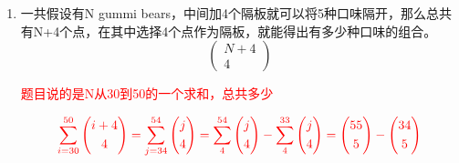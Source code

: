 \documentclass{article}
\begin{document}
\begin{enumerate}[label=(\alph*)]
\item 一共假设有N gummi bears，中间加4个隔板就可以将5种口味隔开，那么总共有N+4个点，在其中选择4个点作为隔板，就能得出有多少种口味的组合。
$$
\left( \begin{gathered}N+4\\ 4\end{gathered} \right)  
$$

\textcolor{red}{题目说的是N从30到50的一个求和，总共多少}


$$
\textcolor{red} {
\sum^{50}_{i=30} \left( \begin{gathered}i+4\\ 4\end{gathered} \right)  =\sum^{54}_{j=34} \left( \begin{gathered}j\\ 4\end{gathered} \right)  =\sum^{54}_{4} \left( \begin{gathered}j\\ 4\end{gathered} \right)  -\sum^{33}_{4} \left( \begin{gathered}j\\ 4\end{gathered} \right)  =\left( \begin{gathered}55\\ 5\end{gathered} \right)  -\left( \begin{gathered}34\\ 5\end{gathered} \right)  
}
$$

\end{enumerate}
\end{document}
